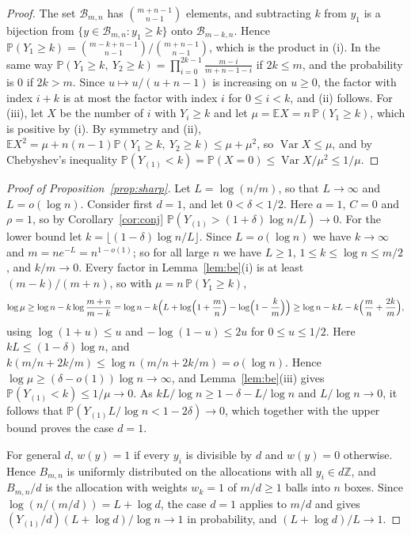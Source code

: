 \documentclass[11pt]{amsart}
\theoremstyle{remark}
\numberwithin{equation}{section}
\newcommand{\Pp}{\mathbb P}
\newcommand{\E}{\mathbb E}
\newcommand{\Z}{\mathbb Z}
\newcommand{\cB}{\mathcal B}
\begin{document}
\begin{proof}
The set $\cB_{m,n}$ has $\binom{m+n-1}{n-1}$ elements, and subtracting $k$ from $y_1$ is a bijection from $\{y\in\cB_{m,n}:y_1\ge k\}$ onto $\cB_{m-k,n}$. Hence $\Pp(Y_1\ge k)=\binom{m-k+n-1}{n-1}/\binom{m+n-1}{n-1}$, which is the product in (i). In the same way $\Pp(Y_1\ge k,\ Y_2\ge k)=\prod_{i=0}^{2k-1}\frac{m-i}{m+n-1-i}$ if $2k\le m$, and the probability is $0$ if $2k>m$. Since $u\mapsto u/(u+n-1)$ is increasing on $u\ge0$, the factor with index $i+k$ is at most the factor with index $i$ for $0\le i<k$, and (ii) follows. For (iii), let $X$ be the number of $i$ with $Y_i\ge k$ and let $\mu=\E X=n\,\Pp(Y_1\ge k)$, which is positive by (i). By symmetry and (ii), $\E X^2=\mu+n(n-1)\Pp(Y_1\ge k,\ Y_2\ge k)\le\mu+\mu^2$, so $\operatorname{Var}X\le\mu$, and by Chebyshev's inequality $\Pp(Y_{(1)}<k)=\Pp(X=0)\le\operatorname{Var}X/\mu^2\le1/\mu$.
\end{proof}

\begin{proof}[Proof of Proposition~\ref{prop:sharp}]
Let $L=\log(n/m)$, so that $L\to\infty$ and $L=o(\log n)$. Consider first $d=1$, and let $0<\delta<1/2$. Here $a=1$, $C=0$ and $\rho=1$, so by Corollary~\ref{cor:conj} $\Pp(Y_{(1)}>(1+\delta)\log n/L)\to0$. For the lower bound let $k=\lfloor(1-\delta)\log n/L\rfloor$. Since $L=o(\log n)$ we have $k\to\infty$ and $m=ne^{-L}=n^{1-o(1)}$; so for all large $n$ we have $L\ge1$, $1\le k\le\log n\le m/2$, and $k/m\to0$. Every factor in Lemma~\ref{lem:be}(i) is at least $(m-k)/(m+n)$, so with $\mu=n\,\Pp(Y_1\ge k)$,
\[
\log\mu\ge\log n-k\log\frac{m+n}{m-k}=\log n-k\Bigl(L+\log\Bigl(1+\frac mn\Bigr)-\log\Bigl(1-\frac km\Bigr)\Bigr)\ge\log n-kL-k\Bigl(\frac mn+\frac{2k}m\Bigr),
\]
using $\log(1+u)\le u$ and $-\log(1-u)\le2u$ for $0\le u\le1/2$. Here $kL\le(1-\delta)\log n$, and $k(m/n+2k/m)\le\log n\,(m/n+2k/m)=o(\log n)$. Hence $\log\mu\ge(\delta-o(1))\log n\to\infty$, and Lemma~\ref{lem:be}(iii) gives $\Pp(Y_{(1)}<k)\le1/\mu\to0$. As $kL/\log n\ge1-\delta-L/\log n$ and $L/\log n\to0$, it follows that $\Pp(Y_{(1)}L/\log n<1-2\delta)\to0$, which together with the upper bound proves the case $d=1$.

For general $d$, $w(y)=1$ if every $y_i$ is divisible by $d$ and $w(y)=0$ otherwise. Hence $B_{m,n}$ is uniformly distributed on the allocations with all $y_i\in d\Z$, and $B_{m,n}/d$ is the allocation with weights $w_k=1$ of $m/d\ge1$ balls into $n$ boxes. Since $\log(n/(m/d))=L+\log d$, the case $d=1$ applies to $m/d$ and gives $(Y_{(1)}/d)(L+\log d)/\log n\to1$ in probability, and $(L+\log d)/L\to1$.
\end{proof}
\end{document}
